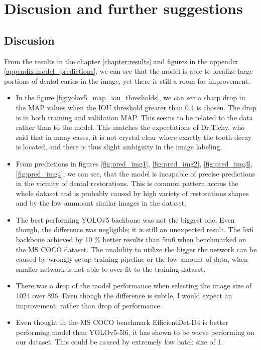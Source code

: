 \chapter{Discusion and further suggestions}
\section{Discusion}
From the results in the chapter \ref{chapter:results} and figures in the appendix \ref{appendix:model_predictions}, we can see that the model is able to localize large portions of dental caries in the image, yet there is still a room for improvement.

\begin{itemize}
    \item In the figure \ref{fig:yolov5_map_iou_thresholds}, we can see a sharp drop in the MAP values when the IOU threshold greater than 0.4 is chosen. The drop is in both training and validation MAP. This seems to be related to the data rather than to the model. This matches the expectations of Dr.Tichy, who said that in many cases, it is not crystal clear where exactly the tooth decay is located, and there is thus slight ambiguity in the image labeling.
    \item From predictions in figures \ref{fig:pred_img1}, \ref{fig:pred_img2}, \ref{fig:pred_img3}, \ref{fig:pred_img4}, we can see, that the model is incapable of precise predictions in the vicinity of dental restorations. This is common pattern accros the whole dataset and is probably caused by high variety of restorations shapes and by the low ammount similar images in the dataset.
    \item The best performing YOLOv5 backbone was not the biggest one. Even though, the difference was negligible; it is still an unexpected result. The 5x6 backbone achieved by 10 \% better results than 5m6 when benchmarked on the MS COCO dataset. The unability to utilize the bigger the network can be caused by wrongly setup training pipeline or the low amount of data, when smaller network is not able to over-fit to the training dataset.
    \item There was a drop of the model performance when selecting the image size of 1024 over 896. Even though the difference is subtle, I would expect an improvement, rather than drop of performance.
    \item Even thought in the MS COCO benchmark EfficientDet-D4 is better performing model than YOLOv5-5l6, it has shown to be worse performing on our dataset. This could be caused by extremely low batch size of 1.
\end{itemize}
